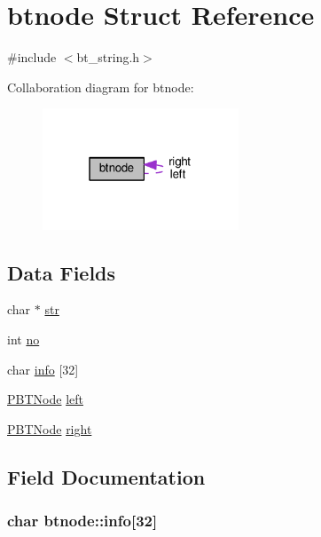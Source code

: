 \hypertarget{structbtnode}{}\section{btnode Struct Reference}
\label{structbtnode}


{\ttfamily \#include $<$bt\+\_\+string.\+h$>$}



Collaboration diagram for btnode\+:\nopagebreak
\begin{figure}[H]
\begin{center}
\leavevmode
\includegraphics[width=166pt]{structbtnode__coll__graph}
\end{center}
\end{figure}
\subsection*{Data Fields}
\begin{DoxyCompactItemize}
\item 
char $\ast$ \hyperlink{structbtnode_ad3235a44ef495ead7832dc7242184d3b}{str}
\item 
int \hyperlink{structbtnode_ae1befed4e49931603b1a62f760242f52}{no}
\item 
char \hyperlink{structbtnode_a822bfc05cc3514c5d2799f66c65112e8}{info} \mbox{[}32\mbox{]}
\item 
\hyperlink{bt__string_8h_af6fcd462cd0ec5c31aed2b5c7d6c763c}{P\+B\+T\+Node} \hyperlink{structbtnode_a595372884aee31dd6b91ba5400f98794}{left}
\item 
\hyperlink{bt__string_8h_af6fcd462cd0ec5c31aed2b5c7d6c763c}{P\+B\+T\+Node} \hyperlink{structbtnode_a5a315554fa5e275f6f505e94135b1cf4}{right}
\end{DoxyCompactItemize}


\subsection{Field Documentation}
\subsubsection[{\texorpdfstring{info}{info}}]{\setlength{\rightskip}{0pt plus 5cm}char btnode\+::info\mbox{[}32\mbox{]}}\hypertarget{structbtnode_a822bfc05cc3514c5d2799f66c65112e8}{}\label{structbtnode_a822bfc05cc3514c5d2799f66c65112e8}
